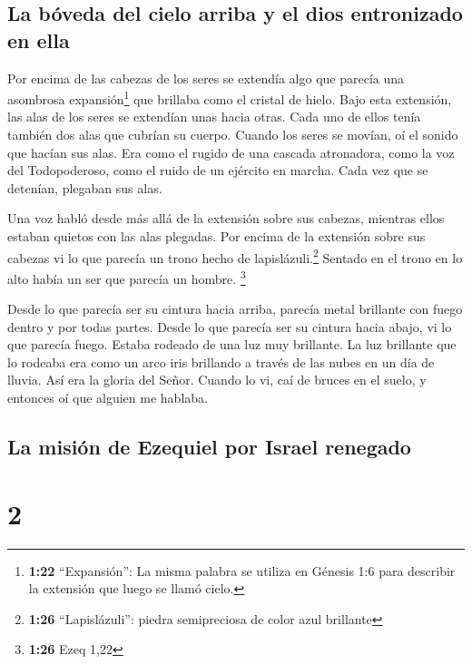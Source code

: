 \hypertarget{la-buxf3veda-del-cielo-arriba-y-el-dios-entronizado-en-ella}{%
\subsection{La bóveda del cielo arriba y el dios entronizado en
ella}\label{la-buxf3veda-del-cielo-arriba-y-el-dios-entronizado-en-ella}}

 Por encima de las cabezas de los seres se extendía algo
que parecía una asombrosa expansión\footnote{\textbf{1:22}
  ``Expansión'': La misma palabra se utiliza en Génesis 1:6 para
  describir la extensión que luego se llamó cielo.} que brillaba como el
cristal de hielo.  Bajo esta extensión, las alas de los
seres se extendían unas hacia otras. Cada uno de ellos tenía también dos
alas que cubrían su cuerpo.  Cuando los seres se movían,
oí el sonido que hacían sus alas. Era como el rugido de una cascada
atronadora, como la voz del Todopoderoso, como el ruido de un ejército
en marcha. Cada vez que se detenían, plegaban sus alas.

 Una voz habló desde más allá de la extensión sobre sus
cabezas, mientras ellos estaban quietos con las alas plegadas.
 Por encima de la extensión sobre sus cabezas vi lo que
parecía un trono hecho de lapislázuli.\footnote{\textbf{1:26}
  ``Lapislázuli'': piedra semipreciosa de color azul brillante} Sentado
en el trono en lo alto había un ser que parecía un hombre. \footnote{\textbf{1:26}
  Ezeq 1,22}

 Desde lo que parecía ser su cintura hacia arriba,
parecía metal brillante con fuego dentro y por todas partes. Desde lo
que parecía ser su cintura hacia abajo, vi lo que parecía fuego. Estaba
rodeado de una luz muy brillante.  La luz brillante que
lo rodeaba era como un arco iris brillando a través de las nubes en un
día de lluvia. Así era la gloria del Señor. Cuando lo vi, caí de bruces
en el suelo, y entonces oí que alguien me hablaba.

\hypertarget{la-misiuxf3n-de-ezequiel-por-israel-renegado}{%
\subsection{La misión de Ezequiel por Israel
renegado}\label{la-misiuxf3n-de-ezequiel-por-israel-renegado}}

\hypertarget{section-1}{%
\section{2}\label{section-1}}

